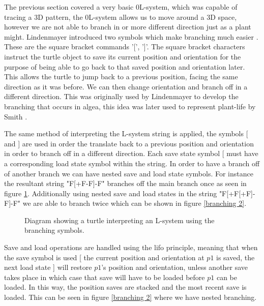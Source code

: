 \begin{flushleft}

The previous section covered a very basic 0L-system, which was capable of tracing a 3D pattern, the 0L-system allows us to move around a 3D space, however we are not able to branch in or more different direction just as a plant might. Lindenmayer introduced two symbols which make branching much easier \cite{lindenmayer1968mathematical}. These are the square bracket commands '[', ']'. The square bracket characters instruct the turtle object to save its current position and orientation for the purpose of being able to go back to that saved position and orientation later. This allows the turtle to jump back to a previous position, facing the same direction as it was before. We can then change orientation and branch off in a different direction. This was originally used by Lindenmayer to develop the branching that occurs in algea, this idea was later used to represent plant-life by Smith \cite{smith1984plants}. \\

\vspace{5mm}

The same method of interpreting the L-system string is applied, the symbols [ and ] are used in order the translate back to a previous position and orientation in order to branch off in a different direction. Each save state symbol [ must have a corresponding load state symbol within the string. In order to have a branch off of another branch we can have nested save and load state symbols. For instance the resultant string "F[+F-F]-F" branches off the main branch once as seen in figure \ref{branching 1}. Additionally using nested save and load states in the string "F[+F[+F]-F]-F" we are able to branch twice which can be shown in figure \ref{branching 2}.

\begin{figure}[htbp]
	{\centering
		\setlength{\fboxrule}{1pt}
		\vspace{7px}
		\caption{Diagram showing a turtle interpreting an L-system using the branching symbols.} \label{branching 1}
	}
\end{figure}
\FloatBarrier

Save and load operations are handled using the \acrfull{lifo} principle, meaning that when the save symbol is used [ the current position and orientation at $p1$ is saved, the next load state ] will restore $p1$'s position and orientation, unless another save takes place in which case that save will have to be loaded before $p1$ can be loaded. In this way, the position saves are stacked and the most recent save is loaded. This can be seen in figure \ref{branching 2} where we have nested branching. \\


\end{flushleft}

